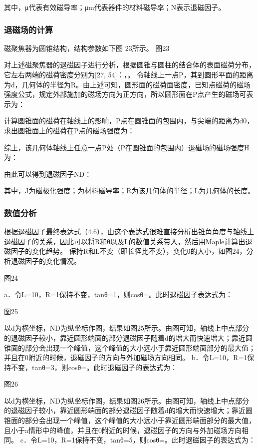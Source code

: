 \documentclass[a4paper,12pt，twoside]{ctexart}
\begin{document}
	其中，μ代表有效磁导率；μm代表器件的材料磁导率；N表示退磁因子。
	
	
	\subsubsection{退磁场的计算}
	磁聚焦器为圆锥结构，结构参数如下图 23所示。
	图23\par 
	 	对上述磁聚焦器的退磁因子进行分析，根据圆锥与圆柱的结合体的表面磁荷分布，它左右两端的磁荷密度分别为[27, 54]：，。
	 	令轴线上一点P，其到圆形平面的距离为d，几何体的半径为R。由上述可知，圆形面的磁荷面密度，已知点磁荷的磁场强度公式，规定外部施加的磁场方向为正方向，所以圆形面在P点产生的磁场可表示为：\par
	 	
	 	
	 	计算圆锥面的磁荷在轴线上的影响，P点在圆锥面的包围内，与尖端的距离为d0，求出圆锥面上的磁荷在P点的磁场强度为：\par
	 	综上，该几何体轴线上任意一点P处（P在圆锥面的包围内）退磁场的磁场强度H为：\par 
	 	由此可以得到退磁因子ND：\par 
	 	
	 	其中，J为磁极化强度；为材料磁导率；R为该几何体的半径；L为几何体的长度。\par
	\subsubsection{数值分析}
	根据退磁因子最终表达式（4.6），由这个表达式很难直接分析出锥角角度与轴线上退磁因子的关系，因此可以将R和θ以及L的数值关系带入，然后用Maple计算出退磁因子的变化趋势。
	保持R和L不变（即长径比不变），变化θ的大小，如图24，分析退磁因子的变化情况。\par 
	图24\par 
	a．令L=10，R=1保持不变，tanθ=1，则cosθ=。此时退磁因子表达式为：\par 
	
	图25\par 
	以d为横坐标，ND为纵坐标作图，结果如图25所示。由图可知，轴线上中点部分的退磁因子较小，靠近圆形端面的部分退磁因子随着d的增大而快速增大；靠近圆锥面的部分会出现一个峰值，这个峰值的大小远小于靠近圆形端面部分的最大值；并且在0附近的时候，退磁因子的方向与外加磁场方向相同。
	b．令L=10，R=1保持不变，tanθ=3，则cosθ=。此时退磁因子的表达式为：\par 
	
	图26\par 
	以d为横坐标，ND为纵坐标作图，结果如图26所示。由图可知，轴线上中点部分的退磁因子较小，靠近圆形端面的部分退磁因子随着d的增大而快速增大；靠近圆锥面的部分会出现一个峰值，这个峰值的大小远小于靠近圆形端面部分的最大值，且小于a情形中的峰值，并且在0附近的时候，退磁因子的方向与外加磁场方向相同。
	c．令L=10，R=1保持不变，tanθ=5，则cosθ=。此时退磁因子的表达式为：\par 
	
\end{document}

